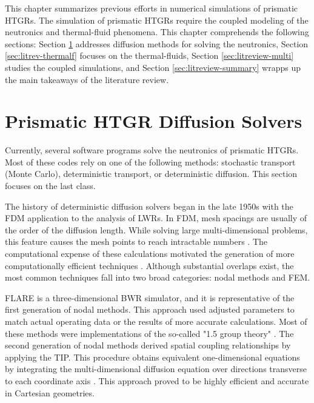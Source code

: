 This chapter summarizes previous efforts in numerical simulations of prismatic HTGRs.
The simulation of prismatic HTGRs require the coupled modeling of the neutronics and thermal-fluid phenomena.
This chapter comprehends the following sections: Section \ref{sec:litreview-neut} addresses diffusion methods for solving the neutronics, Section \ref{sec:litrev-thermalf} focuses on the thermal-fluids, Section \ref{sec:litreview-multi} studies the coupled simulations, and Section \ref{sec:litreview-summary} wrapps up the main takeaways of the literature review.

\section{Prismatic HTGR Diffusion Solvers}
\label{sec:litreview-neut}

Currently, several software programs solve the neutronics of prismatic \glspl{HTGR}.
Most of these codes rely on one of the following methods: stochastic transport (Monte Carlo), deterministic transport, or deterministic diffusion.
This section focuses on the last class.

The history of deterministic diffusion solvers began in the late 1950s with the \gls{FDM} application to the analysis of \glspl{LWR}.
In \gls{FDM}, mesh spacings are usually of the order of the diffusion length.
While solving large multi-dimensional problems, this feature causes the mesh points to reach intractable numbers \cite{lewis_finite_1986}.
The computational expense of these calculations motivated the generation of more computationally efficient techniques \cite{lawrence_progress_1986}.
Although substantial overlaps exist, the most common techniques fall into two broad categories: nodal methods and \gls{FEM}.

FLARE \cite{delp_flare_1964} is a three-dimensional \gls{BWR} simulator, and it is representative of the first generation of nodal methods.
This approach used adjusted parameters to match actual operating data or the results of more accurate calculations.
Most of these methods were implementations of the so-called "1.5 group theory" \cite{gupta_nodal_1981}.
The second generation of nodal methods derived spatial coupling relationships by applying the \gls{TIP}.
This procedure obtains equivalent one-dimensional equations by integrating the multi-dimensional diffusion equation over directions transverse to each coordinate axis \cite{lawrence_progress_1986}.
This approach proved to be highly efficient and accurate in Cartesian geometries.


